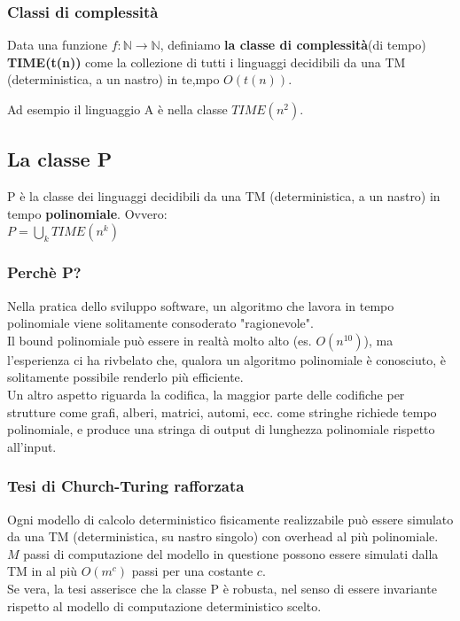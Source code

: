 \documentclass[a4paper, 12pt]{article}
\begin{document}
\subsubsection{Classi di complessit\`a}
\begin{center}
Data una funzione $f: \mathbb{N} \rightarrow \mathbb{N}$, definiamo \textbf{la classe di complessit\`a}(di tempo) \textbf{TIME(t(n))} come la collezione di tutti i linguaggi decidibili da una TM (deterministica, a un nastro) in te,mpo $O(t(n))$.
\end{center}
Ad esempio il linguaggio A \`e nella classe $TIME(n^{2})$.
\subsection{La classe P}
\begin{center}
P \`e la classe dei linguaggi decidibili da una TM (deterministica, a un nastro) in tempo \textbf{polinomiale}. Ovvero:\\
$P = \bigcup_{k} TIME(n^{k})$
\end{center}
\subsubsection{Perch\`e P?}
Nella pratica dello sviluppo software, un algoritmo che lavora in tempo polinomiale viene solitamente consoderato "ragionevole".\\ Il bound polinomiale pu\`o essere in realt\`a molto alto (es. $O(n^{10})$), ma l'esperienza ci ha rivbelato che, qualora un algoritmo polinomiale \`e conosciuto, \`e solitamente possibile renderlo pi\`u efficiente.\\Un altro aspetto riguarda la codifica, la maggior parte delle codifiche per strutture come grafi, alberi, matrici, automi, ecc. come stringhe richiede tempo polinomiale, e produce una stringa di output di lunghezza polinomiale rispetto all'input.
\subsubsection{Tesi di Church-Turing rafforzata}
Ogni modello di calcolo deterministico fisicamente realizzabile pu\`o essere simulato da una TM (deterministica, su nastro singolo) con overhead al pi\`u polinomiale.\\
$M$ passi di computazione del modello in questione possono essere simulati dalla TM in al pi\`u $O(m^{c})$ passi per una costante $c$.\\
Se vera, la tesi asserisce che la classe P \`e robusta, nel senso di essere invariante rispetto al modello di computazione deterministico scelto.
\end{document}
